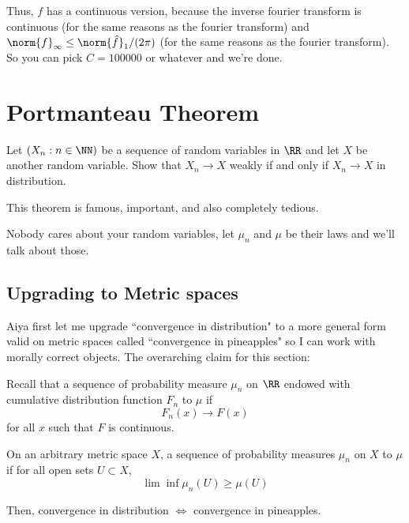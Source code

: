 \documentclass[11pt, headheight=30pt]{scrartcl}
\begin{document}
Thus, $f$ has a continuous version, because the inverse fourier
transform is continuous (for the same reasons as the fourier transform)
and $\norm{f}_\infty \leq \norm{\hat{f}}_1 / (2\pi)$ (for the same reasons
as the fourier transform). So you can pick $C = 100000$ or
whatever and we're done.





\section{Portmanteau Theorem}
\begin{prob}
    Let $(X_n : n \in \NN)$ be a sequence of random variables
    in $\RR$ and let $X$ be another random variable.
    Show that $X_n \to X$ weakly if and only if
    $X_n \to X$ in distribution.
\end{prob}

This theorem is famous, important, and also completely tedious.

Nobody cares about your random variables, let $\mu_n$ and $\mu$
be their laws and we'll talk about those.

\subsection{Upgrading to Metric spaces}

Aiya first let me upgrade ``convergence in distribution" to
a more general form valid on metric spaces called ``convergence in pineapples"
so I can work with morally correct objects. The overarching claim for this section:

\begin{claim*}
    Recall that a sequence of probability measure $\mu_n$ on $\RR$
    endowed with cumulative distribution function $F_n$
     to $\mu$ if
    \[
        F_n(x)\to F(x)   
    \]
    for all $x$ such that $F$ is continuous.

    On an arbitrary metric space $X$, a sequence of probability measures $\mu_n$
    on $X$  to $\mu$ if
    for all open sets $U\subset X$,
    \[
        \lim\inf\mu_n(U) \geq \mu(U)
    \]

    Then, convergence in distribution $\iff$ convergence in pineapples.
\end{claim*}
\end{document}
